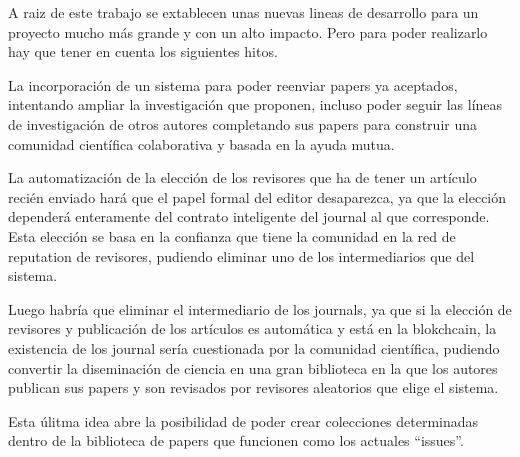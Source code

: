 A raiz de este trabajo se extablecen unas nuevas lineas de desarrollo para un
proyecto mucho más grande y con un alto impacto. Pero para poder realizarlo hay
que tener en cuenta los siguientes hitos.

La incorporación de un sistema para poder reenviar papers ya aceptados,
intentando ampliar la investigación que proponen, incluso poder seguir las
líneas de investigación de otros autores completando sus papers para construir
una comunidad científica colaborativa y basada en la ayuda mutua.

La automatización de la elección de los revisores que ha de tener un artículo
recién enviado hará que el papel formal del editor desaparezca, ya que la
elección dependerá enteramente del contrato inteligente del journal al que
corresponde. Esta elección se basa en la confianza que tiene la comunidad en la
red de reputation de revisores, pudiendo eliminar uno de los intermediarios que
del sistema.

Luego habría que eliminar el intermediario de los journals, ya que si la
elección de revisores y publicación de los artículos es automática y está en la
blokchcain, la existencia de los journal sería cuestionada por la comunidad
científica, pudiendo convertir la diseminación de ciencia en una gran biblioteca
en la que los autores publican sus papers y son revisados por revisores
aleatorios que elige el sistema.

Esta úlitma idea abre la posibilidad de poder crear colecciones determinadas
dentro de la biblioteca de papers que funcionen como los actuales ``issues''.

